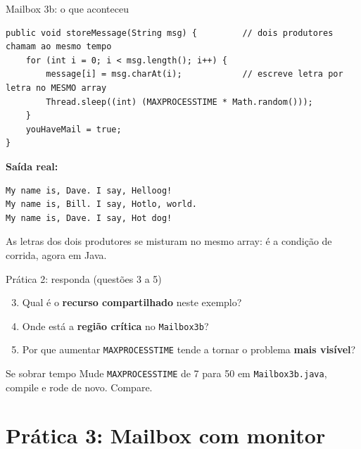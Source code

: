 \documentclass[aspectratio=169]{beamer}
\begin{document}
\begin{frame}[fragile]{Mailbox 3b: o que aconteceu}
\begin{lstlisting}[style=java, basicstyle=\ttfamily\scriptsize\color{termfg}]
public void storeMessage(String msg) {         // dois produtores chamam ao mesmo tempo
    for (int i = 0; i < msg.length(); i++) {
        message[i] = msg.charAt(i);            // escreve letra por letra no MESMO array
        Thread.sleep((int) (MAXPROCESSTIME * Math.random()));
    }
    youHaveMail = true;
}
\end{lstlisting}

\textbf{Saída real:}
\begin{lstlisting}[style=terminal, basicstyle=\ttfamily\scriptsize\color{termfg}]
My name is, Dave. I say, Helloog!
My name is, Bill. I say, Hotlo, world.
My name is, Dave. I say, Hot dog!
\end{lstlisting}

\small As letras dos dois produtores se misturam no mesmo array: é a condição de corrida, agora em Java.
\end{frame}

\begin{frame}{Prática 2: responda (questões 3 a 5)}
\begin{enumerate}
    \setcounter{enumi}{2}
    \item Qual é o \textbf{recurso compartilhado} neste exemplo?
    \item Onde está a \textbf{região crítica} no \texttt{Mailbox3b}?
    \item Por que aumentar \texttt{MAXPROCESSTIME} tende a tornar o problema \textbf{mais visível}?
\end{enumerate}

\vspace{1em}
\begin{exampleblock}{Se sobrar tempo}
Mude \texttt{MAXPROCESSTIME} de 7 para 50 em \texttt{Mailbox3b.java}, compile e rode de novo. Compare.
\end{exampleblock}
\end{frame}

\section{Prática 3: Mailbox com monitor}
\end{document}
